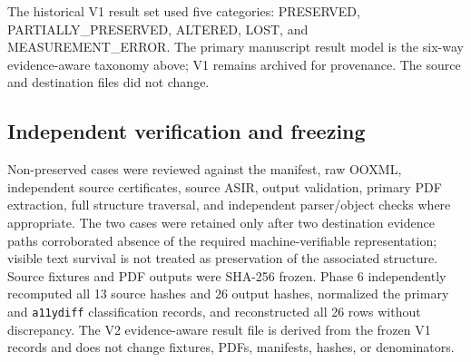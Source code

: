 The historical V1 result set used five categories: PRESERVED, PARTIALLY\_PRESERVED, ALTERED, LOST, and MEASUREMENT\_ERROR. The primary manuscript result model is the six-way evidence-aware taxonomy above; V1 remains archived for provenance. The source and destination files did not change.

\subsection{Independent verification and freezing}

Non-preserved cases were reviewed against the manifest, raw OOXML, independent source certificates, source ASIR, output validation, primary PDF extraction, full structure traversal, and independent parser/object checks where appropriate. The two \confirmedlost{} cases were retained only after two destination evidence paths corroborated absence of the required machine-verifiable representation; visible text survival is not treated as preservation of the associated structure. Source fixtures and PDF outputs were SHA-256 frozen. Phase 6 independently recomputed all 13 source hashes and 26 output hashes, normalized the primary and \texttt{a11ydiff} classification records, and reconstructed all 26 rows without discrepancy. The V2 evidence-aware result file is derived from the frozen V1 records and does not change fixtures, PDFs, manifests, hashes, or denominators.


